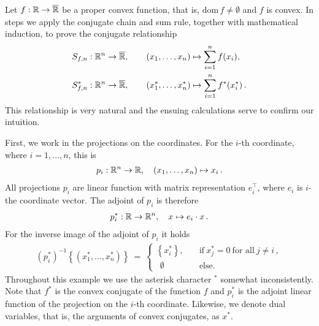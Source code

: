 \begin{example}
  \label{cv:cc:ex}
  Let 
  $
    f:\mathbb{R}\to \overline{\mathbb{R}}
  $
  be a proper convex function, that is, 
  $
    \mathrm{dom}\,f
    \neq
    \emptyset
  $
  and $f$ is convex.
  In steps we apply the conjugate chain and sum rule, together with mathematical induction,
  to prove the conjugate relationship 
  \begin{align*}
    &S_{f,n}:\mathbb{R}^n \to \overline{\mathbb{R}},
    \qquad
    (x_1,\ldots,x_n)
    \mapsto
    \sum_{i=1}^{n} 
    f(x_i)
    ,
    \\
    &S_{f,n}^*:\mathbb{R}^n \to \overline{\mathbb{R}},
    \qquad
    (x^*_1,\ldots,x^*_n)
    \mapsto
    \sum_{i=1}^{n} 
    f^*(x^*_i)
    \,.
  \end{align*}
  This relationship is very natural and the ensuing calculations serve to confirm our intuition.

  First, we work in the projections on the coordinates. 
  For the $i$-th coordinate, where $i=1,\ldots,n$, this is 
  \begin{gather}
    p_i:\mathbb{R}^n\to \mathbb{R}
    ,
    \quad
    (x_1,\ldots,x_n)
    \mapsto
    x_i\,.
  \end{gather}
  All projections 
  $p_i$
  are linear function with matrix representation
  $
    e_i^\top
  $,
  where $e_i$ is $i$-the coordinate vector.
  The adjoint of $p_i$ is therefore
  \begin{gather}
    p^*_i:\mathbb{R}\to \mathbb{R}^n
    ,
    \quad
    x
    \mapsto
    e_i\cdot x
    \,.
  \end{gather}
  For the inverse image of the adjoint of $p_i$ it holds
  \begin{gather}
    (p_i^*)^{-1}
    \left\{ 
    (x_1^*,\ldots,x_n^*)
    \right\}
    \ 
    =
    \ 
    \begin{cases}
      \left\{ x_i^* \right\},
      \quad
      &\text{if}\ 
      x_j^*=0\ \text{for all}\ j\neq i\,,
      \\
      \ \ \emptyset
      \quad
      &\text{else.}
    \end{cases}
  \end{gather}
  Throughout this example we use the asterisk character $^*$ somewhat inconsistently. 
  Note that $f^*$ is the convex conjugate 
  of the function $f$ and $p_i^*$ is the adjoint linear function of the projection on the $i$-th coordinate. Likewise, we denote dual variables, that is, the arguments of convex conjugates, as $x^*$.


\end{example}
